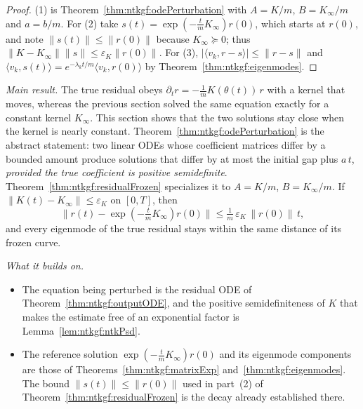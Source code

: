 \begin{proof}
  \leanok
(1) is Theorem~\ref{thm:ntkgf:odePerturbation} with $A=K/m$, $B=K_\infty/m$ and $a=b/m$. For (2) take $s(t)=\exp(-\frac tmK_\infty)r(0)$, which starts at $r(0)$, and note
$\|s(t)\|\le\|r(0)\|$ because $K_\infty\succeq0$; thus $\|K-K_\infty\|\|s\|\le\varepsilon_K\|r(0)\|$. For (3), $|\langle v_k,r-s\rangle|\le\|r-s\|$ and
$\langle v_k,s(t)\rangle=e^{-\lambda_kt/m}\langle v_k,r(0)\rangle$ by Theorem~\ref{thm:ntkgf:eigenmodes}.
\end{proof}

\begin{remark}\label{rmk:ntkgf:odeStabilityRole}
\emph{Main result.} The true residual obeys $\partial_tr=-\frac1mK(\theta(t))\,r$ with a kernel that moves, whereas the previous section solved the same equation exactly for a constant kernel $K_\infty$. This section shows that the two solutions stay close when the kernel is nearly constant. Theorem~\ref{thm:ntkgf:odePerturbation} is the abstract statement: two linear ODEs whose coefficient matrices differ by a bounded amount produce solutions that differ by at most the initial gap plus $a\,t$, \emph{provided the true coefficient is positive semidefinite}. Theorem~\ref{thm:ntkgf:residualFrozen} specializes it to $A=K/m$, $B=K_\infty/m$. If $\|K(t)-K_\infty\|\le\varepsilon_K$ on $[0,T]$, then
\[
  \bigl\|r(t)-\exp(-\tfrac tmK_\infty)r(0)\bigr\|\le\tfrac1m\,\varepsilon_K\,\|r(0)\|\,t,
\]
and every eigenmode of the true residual stays within the same distance of its frozen curve.

\emph{What it builds on.}
\begin{itemize}
  \item The equation being perturbed is the residual ODE of Theorem~\ref{thm:ntkgf:outputODE}, and the positive semidefiniteness of $K$ that makes the estimate free of an exponential factor is Lemma~\ref{lem:ntkgf:ntkPsd}.
  \item The reference solution $\exp(-\frac tmK_\infty)r(0)$ and its eigenmode components are those of Theorems~\ref{thm:ntkgf:matrixExp} and~\ref{thm:ntkgf:eigenmodes}. The bound $\|s(t)\|\le\|r(0)\|$ used in part~(2) of Theorem~\ref{thm:ntkgf:residualFrozen} is the decay already established there.
\end{itemize}


\end{remark}
